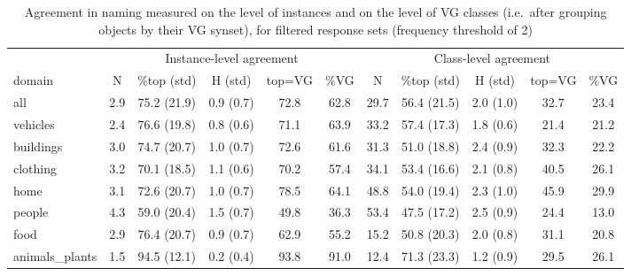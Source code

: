 \begin{table}
\begin{tabular}{lccccc|ccccc}
\toprule
 & \multicolumn{5}{c|}{Instance-level agreement} & \multicolumn{5}{c}{Class-level agreement}\\ 
          domain &    N &         \%top (std) &          H (std) & top=VG &   \%VG &     N &         \%top (std) &          H (std) & top=VG &   \%VG \\
\midrule
            all &  2.9 &  75.2 (21.9) &  0.9 (0.7) &   72.8 &  62.8 &  29.7 &  56.4 (21.5) &  2.0 (1.0) &   32.7 &  23.4 \\
       vehicles &  2.4 &  76.6 (19.8) &  0.8 (0.6) &   71.1 &  63.9 &  33.2 &  57.4 (17.3) &  1.8 (0.6) &   21.4 &  21.2 \\
      buildings &  3.0 &  74.7 (20.7) &  1.0 (0.7) &   72.6 &  61.6 &  31.3 &  51.0 (18.8) &  2.4 (0.9) &   32.3 &  22.2 \\
       clothing &  3.2 &  70.1 (18.5) &  1.1 (0.6) &   70.2 &  57.4 &  34.1 &  53.4 (16.6) &  2.1 (0.8) &   40.5 &  26.1 \\
           home &  3.1 &  72.6 (20.7) &  1.0 (0.7) &   78.5 &  64.1 &  48.8 &  54.0 (19.4) &  2.3 (1.0) &   45.9 &  29.9 \\
         people &  4.3 &  59.0 (20.4) &  1.5 (0.7) &   49.8 &  36.3 &  53.4 &  47.5 (17.2) &  2.5 (0.9) &   24.4 &  13.0 \\
           food &  2.9 &  76.4 (20.7) &  0.9 (0.7) &   62.9 &  55.2 &  15.2 &  50.8 (20.3) &  2.0 (0.8) &   31.1 &  20.8 \\
 animals\_plants &  1.5 &  94.5 (12.1) &  0.2 (0.4) &   93.8 &  91.0 &  12.4 &  71.3 (23.3) &  1.2 (0.9) &   29.5 &  26.1 \\
\bottomrule
\end{tabular}

\caption{Agreement in naming measured on the level of instances and on the level of VG classes (i.e.\ after grouping objects by their VG synset), for filtered response sets (frequency threshold of 2)}
\label{tab:agree}
\end{table}






